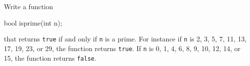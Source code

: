 \nextq
Write a function
\begin{console}
bool isprime(int n);
\end{console}
that returns \verb!true! if and only if \verb!n! is a prime.
For instance if \verb!n! is 2, 3, 5, 7, 11, 13, 17, 19, 23, or 29,
the function returns \verb!true!.
If \verb!n! is 0, 1, 4, 6, 8, 9, 10, 12, 14, or 15,
the function returns \verb!false!.
\\
\ANSWER
\begin{answercode}

\end{answercode}

